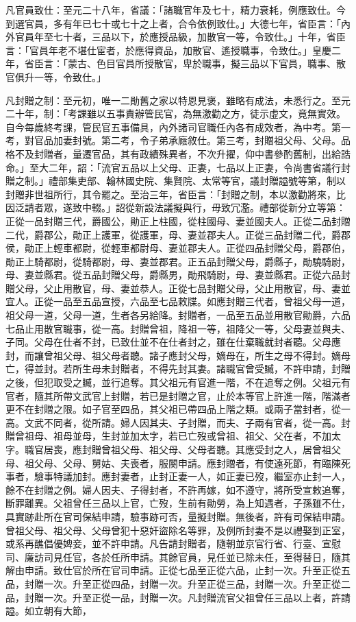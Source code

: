 \begin{pinyinscope}
 凡官員致仕：至元二十八年，省議：「諸職官年及七十，精力衰耗，例應致仕。今到選官員，多有年已七十或七十之上者，合令依例致仕。」大德七年，省臣言：「內外官員年至七十者，三品以下，於應授品級，加散官一等，令致仕。」十年，省臣言：「官員年老不堪仕宦者，於應得資品，加散官、遙授職事，令致仕。」皇慶二年，省臣言：「蒙古、色目官員所授散官，卑於職事，擬三品以下官員，職事、散官俱升一等，令致仕。」



 凡封贈之制：至元初，唯一二勛舊之家以特恩見褒，雖略有成法，未悉行之。至元二十年，制：「考課雖以五事責辦管民官，為無激勸之方，徒示虛文，竟無實效。自今每歲終考課，管民官五事備具，內外諸司官職任內各有成效者，為中考。第一考，對官品加妻封號。第二考，令子弟承廕敘仕。第三考，封贈祖父母、父母。品格不及封贈者，量遷官品，其有政績殊異者，不次升擢，仰中書參酌舊制，出給誥命。」至大二年，詔：「流官五品以上父母、正妻，七品以上正妻，令尚書省議行封贈之制。」禮部集吏部、翰林國史院、集賢院、太常等官，議封贈謚號等第，制以封贈非世祖所行，其令罷之。至治三年，省臣言：「封贈之制，本以激勸將來，比因泛請者眾，遂致中輟。」詔從新設法議擬與行，毋致冗濫。禮部從新分立等第：正從一品封贈三代，爵國公，勛正上柱國，從柱國母、妻並國夫人。正從二品封贈二代，爵郡公，勛正上護軍，從護軍，母、妻並郡夫人。正從三品封贈二代，爵郡侯，勛正上輕車都尉，從輕車都尉母、妻並郡夫人。正從四品封贈父母，爵郡伯，勛正上騎都尉，從騎都尉，母、妻並郡君。正五品封贈父母，爵縣子，勛驍騎尉，母、妻並縣君。從五品封贈父母，爵縣男，勛飛騎尉，母、妻並縣君。正從六品封贈父母，父止用散官，母、妻並恭人。正從七品封贈父母，父止用散官，母、妻並宜人。正從一品至五品宣授，六品至七品敕牒。如應封贈三代者，曾祖父母一道，祖父母一道，父母一道，生者各另給降。封贈者，一品至五品並用散官勛爵，六品七品止用散官職事，從一高。封贈曾祖，降祖一等，祖降父一等，父母妻並與夫、子同。父母在仕者不封，已致仕並不在仕者封之，雖在仕棄職就封者聽。父母應封，而讓曾祖父母、祖父母者聽。諸子應封父母，嫡母在，所生之母不得封。嫡母亡，得並封。若所生母未封贈者，不得先封其妻。諸職官曾受贓，不許申請，封贈之後，但犯取受之贓，並行追奪。其父祖元有官進一階，不在追奪之例。父祖元有官者，隨其所帶文武官上封贈，若已是封贈之官，止於本等官上許進一階，階滿者更不在封贈之限。如子官至四品，其父祖已帶四品上階之類。或兩子當封者，從一高。文武不同者，從所請。婦人因其夫、子封贈，而夫、子兩有官者，從一高。封贈曾祖母、祖母並母，生封並加太字，若已亡歿或曾祖、祖父、父在者，不加太字。職官居喪，應封贈曾祖父母、祖父母、父母者聽。其應受封之人，居曾祖父母、祖父母、父母、舅姑、夫喪者，服闋申請。應封贈者，有使遠死節，有臨陳死事者，驗事特議加封。應封妻者，止封正妻一人，如正妻已歿，繼室亦止封一人，餘不在封贈之例。婦人因夫、子得封者，不許再嫁，如不遵守，將所受宣敕追奪，斷罪離異。父祖曾任三品以上官，亡歿，生前有勛勞，為上知遇者，子孫雖不仕，具實跡赴所在官司保結申請，驗事跡可否，量擬封贈。無後者，許有司保結申請。曾祖父母、祖父母、父母曾犯十惡奸盜除名等罪，及例所封妻不是以禮娶到正室，或系再醮倡優婢妾，並不許申請。凡告請封贈者，隨朝並京官行省、行臺、宣慰司、廉訪司見任官，各於任所申請。其餘官員，見任並已除未任，至得替日，隨其解由申請。致仕官於所在官司申請。正從七品至正從六品，止封一次。升至正從五品，封贈一次。升至正從四品，封贈一次。升至正從三品，封贈一次。升至正從二品，封贈一次。升至正從一品，封贈一次。凡封贈流官父祖曾任三品以上者，許請謚。如立朝有大節，
\end{pinyinscope}
